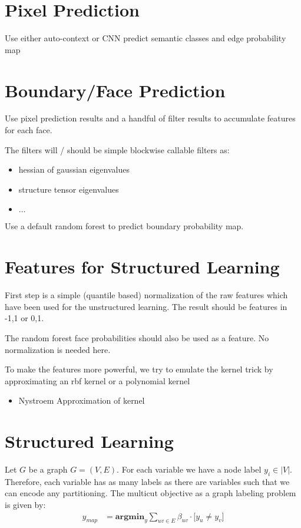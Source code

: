 \documentclass{article}
\begin{document}
\section{Pixel Prediction}

Use either auto-context or CNN predict
semantic classes and edge probability map


\section{Boundary/Face Prediction}

Use pixel prediction results and a
handful of filter results to accumulate
features for each face.

The filters will / should be simple blockwise callable filters as:
\begin{itemize}
\item hessian of gaussian eigenvalues
\item structure tensor eigenvalues
\item$ \ldots$
\end{itemize}

Use a default random forest to predict boundary
probability map.






\section{Features for Structured Learning}
First step is a simple (quantile based)
normalization of the raw features 
which have been used for the unstructured learning.
The result should be features in -1,1 or 0,1.

The random forest face probabilities should also be used
as a feature. No normalization is needed here.

To make the features more powerful, we try
to emulate the kernel trick by approximating an
rbf kernel or a polynomial kernel
\begin{itemize}
\item Nystroem Approximation of kernel
\end{itemize}


\section{Structured Learning}

Let $G$ be a graph $G = (V,E)$.
For each variable  we have a node label $y_i \in |V|$.
Therefore, each variable has as many labels as there are variables
such that we can encode any partitioning.
The multicut objective as a graph labeling problem is given by:
\begin{align*}
    y_{map} &=   
        \textbf{argmin}_{y} 
                \sum_{ uv \in E} 
                    \beta_{uv} \cdot \big[ y_u \neq y_v \big]
\end{align*}
\end{document}
